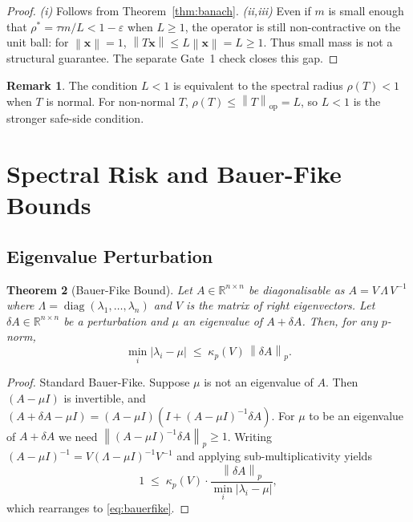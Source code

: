 \documentclass[11pt,a4paper]{article}
\theoremstyle{tealstyle}
\newtheorem{theorem}{Theorem}[section]
\theoremstyle{definition}
\newtheorem{remark}[theorem]{Remark}
\newcommand{\norm}[1]{\left\lVert #1 \right\rVert}
\newcommand{\abs}[1]{\left\lvert #1 \right\rvert}
\newcommand{\R}{\mathbb{R}}
\newcommand{\eps}{\varepsilon}
\newcommand{\cond}{\kappa}
\newcommand{\spectrad}{\rho}
\newcommand{\Tau}{\tau}
\newcommand{\dA}{\delta A}
\newcommand{\eigvec}{V}
\DeclareMathOperator{\diag}{diag}
\begin{document}
\begin{proof}
\textit{(i)} Follows from Theorem~\ref{thm:banach}.
\textit{(ii,iii)} Even if $m$ is small enough that
$\rho^* = \Tau m / L < 1 - \eps$ when $L \ge 1$,
the operator is still non-contractive on the unit ball:
for $\norm{\bm{x}} = 1$, $\norm{T\bm{x}} \le L\norm{\bm{x}} = L \ge 1$.
Thus small mass is not a structural guarantee.
The separate Gate~1 check closes this gap.
\end{proof}

\begin{remark}
The condition $L < 1$ is equivalent to the spectral radius
$\spectrad(T) < 1$ when $T$ is normal.
For non-normal $T$, $\spectrad(T) \le \norm{T}_{\mathrm{op}} = L$,
so $L < 1$ is the stronger safe-side condition.
\end{remark}

\section{Spectral Risk and Bauer-Fike Bounds}
\label{sec:spectral}

\subsection{Eigenvalue Perturbation}

\begin{theorem}[Bauer-Fike Bound]
\label{thm:bauerfike}
Let $A \in \R^{n \times n}$ be diagonalisable as $A = \eigvec\,\Lambda\,\eigvec^{-1}$
where $\Lambda = \diag(\lambda_1,\dots,\lambda_n)$ and $\eigvec$ is the
matrix of right eigenvectors.
Let $\dA \in \R^{n \times n}$ be a perturbation and $\mu$ an eigenvalue of
$A + \dA$.
Then, for any $p$-norm,
\begin{equation}
  \label{eq:bauerfike}
  \min_{i} \abs{\lambda_i - \mu}
  \;\le\; \cond_p(\eigvec)\,\norm{\dA}_p.
\end{equation}
\end{theorem}

\begin{proof}
Standard Bauer-Fike.
Suppose $\mu$ is not an eigenvalue of $A$.
Then $(A - \mu I)$ is invertible, and
$(A + \dA - \mu I) = (A - \mu I)(I + (A - \mu I)^{-1}\dA)$.
For $\mu$ to be an eigenvalue of $A + \dA$ we need
$\norm{(A-\mu I)^{-1}\dA}_p \ge 1$.
Writing $(A - \mu I)^{-1} = \eigvec(\Lambda - \mu I)^{-1}\eigvec^{-1}$
and applying sub-multiplicativity yields
\[
  1 \;\le\; \cond_p(\eigvec)\cdot
        \frac{\norm{\dA}_p}{\min_i\abs{\lambda_i - \mu}},
\]
which rearranges to \eqref{eq:bauerfike}.
\end{proof}
\end{document}
